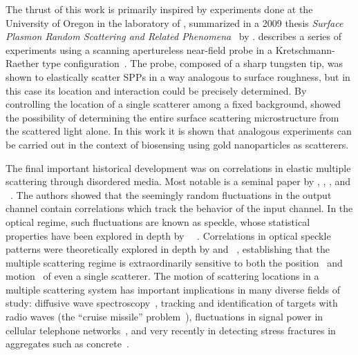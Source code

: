 The thrust of this work is primarily inspired by experiments done at the
University of Oregon in the laboratory of , summarized in a 2009
thesis \textit{Surface Plasmon Random Scattering and Related
Phenomena}~\cite{schumann2009surface} by .  
describes a series of experiments using a scanning apertureless near-field
probe in a Kretschmann-Raether type configuration~\cite{kim1995scanning}.  The
probe, composed of a sharp tungsten tip, was shown to elastically scatter SPPs
in a way analogous to surface roughness, but in this case its location and
interaction could be precisely determined.  By controlling the location of a
single scatterer among a fixed background,  showed the
possibility of determining the entire surface scattering microstructure from
the scattered light alone.  In this work it is shown that analogous
experiments can be carried out in the context of biosensing using gold
nanoparticles as scatterers.

The final important historical development was on correlations in elastic
multiple scattering through disordered media.  Most notable is a seminal paper
by , , , and
~\cite{feng1988correlations}.  The authors showed that the
seemingly random fluctuations in the output channel contain correlations which
track the behavior of the input channel.  In the optical regime, such
fluctuations are known as speckle, whose statistical properties have been
explored in depth by
~\cite{goodman2007speckle}~\cite{goodman1975statistical}.
Correlations in optical speckle patterns were theoretically explored in depth
by  and ~\cite{berkovits1994correlations},
establishing that the multiple scattering regime is extraordinarily sensitive
to both the position~\cite{berkovits1990theory} and
motion~\cite{berkovits1991sensitivity} of even a single scatterer.  The motion
of scattering locations in a multiple scattering system has important
implications in many diverse fields of study: diffusive wave
spectroscopy~\cite{pine1988diffusing}, tracking and identification of targets
with radio waves (the ``cruise missile'' problem~\cite{atkins1991neural}),
fluctuations in signal power in cellular telephone
networks~\cite{abdi2001estimation}, and very recently in detecting stress
fractures in aggregates such as concrete~\cite{larose2010locating}.  
